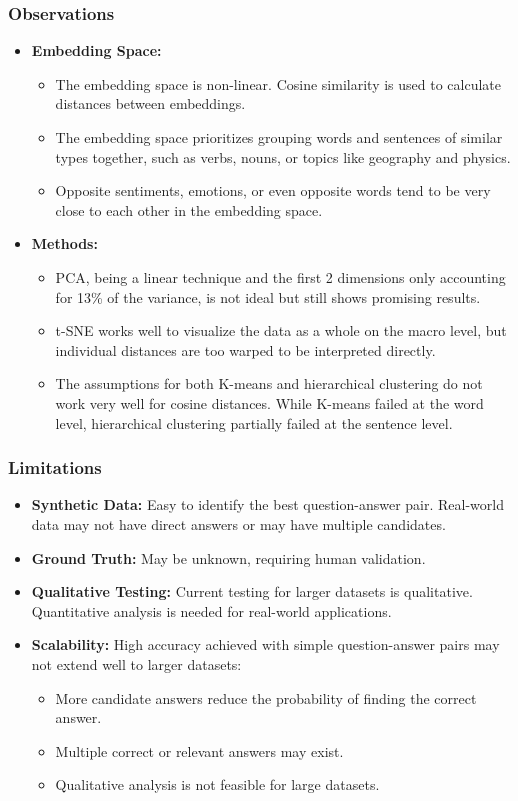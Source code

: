 \documentclass{beamer}
\begin{document}
\begin{frame}
\frametitle{Observations}
\begin{itemize}
    \item \textbf{Embedding Space:} 
    \begin{itemize}
        \item The embedding space is non-linear. Cosine similarity is used to calculate distances between embeddings.
        \item The embedding space prioritizes grouping words and sentences of similar types together, such as verbs, nouns, or topics like geography and physics.
        \item Opposite sentiments, emotions, or even opposite words tend to be very close to each other in the embedding space.
    \end{itemize}
    \item \textbf{Methods:}
    \begin{itemize}
        \item PCA, being a linear technique and the first 2 dimensions only accounting for 13\% of the variance, is not ideal but still shows promising results.
        \item t-SNE works well to visualize the data as a whole on the macro level, but individual distances are too warped to be interpreted directly.
        \item The assumptions for both K-means and hierarchical clustering do not work very well for cosine distances. While K-means failed at the word level, hierarchical clustering partially failed at the sentence level.
    \end{itemize}
\end{itemize}
\end{frame}

\begin{frame}
\frametitle{Limitations}
\begin{itemize}
    \item \textbf{Synthetic Data:} Easy to identify the best question-answer pair. Real-world data may not have direct answers or may have multiple candidates.
    \item \textbf{Ground Truth:} May be unknown, requiring human validation.
    \item \textbf{Qualitative Testing:} Current testing for larger datasets is qualitative. Quantitative analysis is needed for real-world applications.
    \item \textbf{Scalability:} High accuracy achieved with simple question-answer pairs may not extend well to larger datasets:
    \begin{itemize}
        \item More candidate answers reduce the probability of finding the correct answer.
        \item Multiple correct or relevant answers may exist.
        \item Qualitative analysis is not feasible for large datasets.
    \end{itemize}
\end{itemize}
\end{frame}
\end{document}
